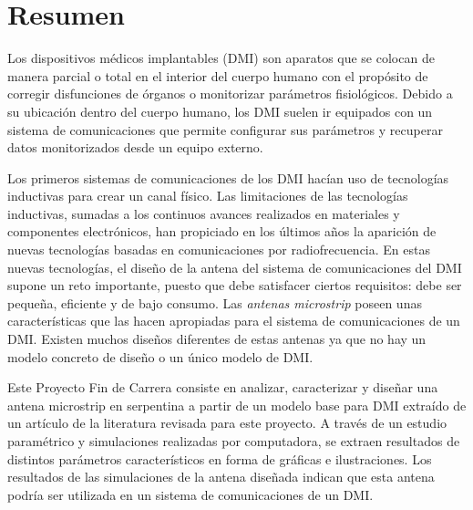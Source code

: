 \chapter*{\textbf{Resumen}}

Los dispositivos médicos implantables (DMI) son aparatos que se colocan de manera parcial o total en el interior del cuerpo humano con el propósito de corregir disfunciones de órganos o monitorizar parámetros fisiológicos. Debido a su ubicación dentro del cuerpo humano, los DMI suelen ir equipados con un sistema de comunicaciones que permite configurar sus parámetros y recuperar datos monitorizados desde un equipo externo.

Los primeros sistemas de comunicaciones de los DMI hacían uso de tecnologías inductivas para crear un canal físico. Las limitaciones de las tecnologías inductivas, sumadas a los continuos avances realizados en materiales y componentes electrónicos, han propiciado en los últimos años la aparición de nuevas tecnologías basadas en comunicaciones por radiofrecuencia. En estas nuevas tecnologías, el diseño de la antena del sistema de comunicaciones del DMI supone un reto importante, puesto que debe satisfacer ciertos requisitos: debe ser pequeña, eficiente y de bajo consumo. Las \textit{antenas microstrip} poseen unas características que las hacen apropiadas para el sistema de comunicaciones de un DMI. Existen muchos diseños diferentes de estas antenas ya que no hay un modelo concreto de diseño o un único modelo de DMI.

Este Proyecto Fin de Carrera consiste en analizar, caracterizar y diseñar una antena microstrip en serpentina a partir de un modelo base para DMI extraído de un artículo de la literatura revisada para este proyecto. A través de un estudio paramétrico y simulaciones realizadas por computadora, se extraen resultados de distintos parámetros característicos en forma de gráficas e ilustraciones. Los resultados de las simulaciones de la antena diseñada indican que esta antena podría ser utilizada en un sistema de comunicaciones de un DMI.

